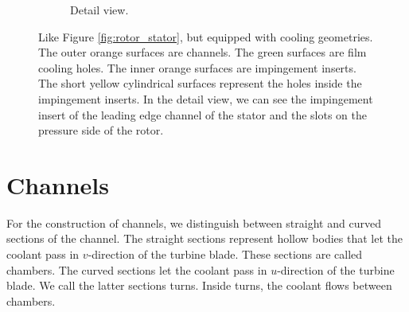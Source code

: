 \documentclass[a4paper, 11pt]{report}
\theoremstyle{definition}
\begin{document}
\begin{figure}[H]
\begin{subfigure}{.49\textwidth}
			\caption{Detail view.}
		\end{subfigure}		
		\caption{Like Figure \ref{fig:rotor_stator}, but equipped with cooling geometries. The outer orange surfaces are channels. The green surfaces are film cooling holes. The inner orange surfaces are impingement inserts. The short yellow cylindrical surfaces represent the holes inside the impingement inserts. In the detail view, we can see the impingement insert of the leading edge channel of the stator and the slots on the pressure side of the rotor.}
		\label{fig:results_complete}
	\end{figure}

\section{Channels}
	 For the construction of channels, we distinguish between straight and curved sections of the channel. The straight sections represent hollow bodies that let the coolant pass in $v$-direction of the turbine blade. These sections are called chambers. The curved sections let the coolant pass in $u$-direction of the turbine blade. We call the latter sections turns. Inside turns, the coolant flows between chambers.
\end{document}
